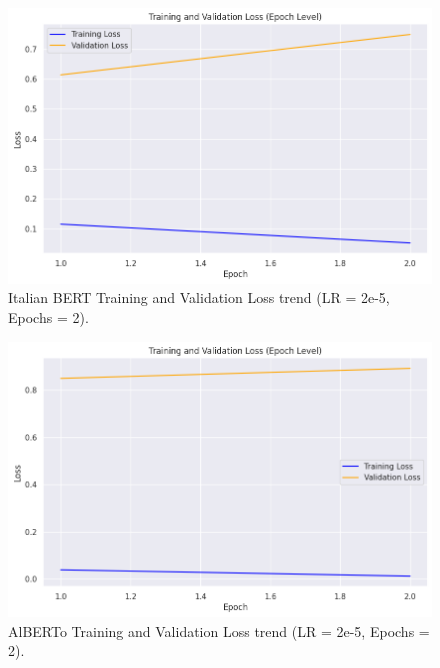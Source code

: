 \begin{figure}
    \includegraphics[width=\columnwidth]{../../results/images/bert_base_losses_2epochs.png}
    \caption{Italian BERT Training and Validation Loss trend (LR = 2e-5, Epochs = 2).}
    \label{fig:bert_base_losses}
\end{figure}

\begin{figure}
    \includegraphics[width=\columnwidth]{../../results/images/alberto_losses_2epochs.png}
    \caption{AlBERTo Training and Validation Loss trend (LR = 2e-5, Epochs = 2).}
    \label{fig:alberto_losses}
\end{figure}
